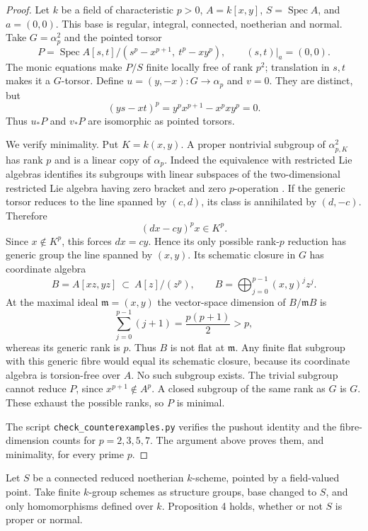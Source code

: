 \begin{proof}
Let $k$ be a field of characteristic $p>0$,
$A=k[x,y]$, $S=\operatorname{Spec}A$, and $a=(0,0)$.  This base is
regular, integral, connected, noetherian and normal.  Take
$G=\alpha_p^2$ and the pointed torsor
\[
P=\operatorname{Spec}
A[s,t]/(s^p-x^{p+1},\ t^p-xy^p),
\qquad (s,t)|_a=(0,0).
\]
The monic equations make $P/S$ finite locally free of rank $p^2$;
translation in $s,t$ makes it a $G$-torsor.  Define
$u=(y,-x)\colon G\to\alpha_p$ and $v=0$.  They are distinct, but
\[
(ys-xt)^p=y^px^{p+1}-x^pxy^p=0.
\]
Thus $u_*P$ and $v_*P$ are isomorphic as pointed torsors.

We verify minimality.  Put $K=k(x,y)$.  A proper nontrivial subgroup
of $\alpha_{p,K}^2$ has rank $p$ and is a linear copy of $\alpha_p$.
Indeed the equivalence with restricted Lie algebras identifies its
subgroups with linear subspaces of the two-dimensional restricted
Lie algebra having zero bracket and zero $p$-operation
\cite[Expos\'e~VIIA, Theorem~8.1.2]{C_SGA3I}.
If the generic torsor reduces to the line spanned by $(c,d)$, its class
is annihilated by $(d,-c)$.  Therefore
\[
(dx-cy)^p x\in K^p.
\]
Since $x\notin K^p$, this forces $dx=cy$.  Hence its only possible
rank-$p$ reduction has generic group the line spanned by $(x,y)$.
Its schematic closure in $G$ has coordinate algebra
\[
B=A[xz,yz]\ \subset\ A[z]/(z^p),
\qquad
B=\bigoplus_{j=0}^{p-1}(x,y)^jz^j.
\]
At the maximal ideal $\mathfrak m=(x,y)$ the vector-space dimension of
$B/\mathfrak m B$ is
\[
\sum_{j=0}^{p-1}(j+1)=\frac{p(p+1)}2>p,
\]
whereas its generic rank is $p$.  Thus $B$ is not flat at $\mathfrak m$.
Any finite flat subgroup with this generic fibre would equal its
schematic closure, because its coordinate algebra is torsion-free over
$A$.  No such subgroup exists.  The trivial subgroup cannot reduce
$P$, since $x^{p+1}\notin A^p$.  A closed subgroup of the same rank as
$G$ is $G$.  These exhaust the possible ranks, so $P$ is minimal.

The script \texttt{check\_counterexamples.py} verifies the pushout
identity and the fibre-dimension counts for $p=2,3,5,7$.  The argument
above proves them, and minimality, for every prime $p$.
\end{proof}

\begin{theorem}[Proved: C.1(ii)]
\label{C:k-morphisms}
Let $S$ be a connected reduced noetherian $k$-scheme, pointed by a
field-valued point.  Take finite $k$-group schemes as structure groups,
base changed to $S$, and only homomorphisms defined over $k$.  Proposition
4 holds, whether or not $S$ is proper or normal.
\end{theorem}

